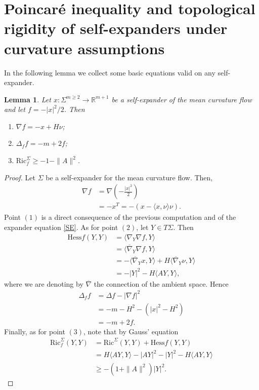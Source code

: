 \documentclass[11pt, leqno]{amsart}
\newtheorem{lemma}[theorem]{Lemma}
\begin{document}
\section{Poincar\'e inequality and topological rigidity of self-expanders under curvature assumptions}\label{SecPoincareExpanders}

In the following lemma we collect some basic equations valid on any self-expander.
\begin{lemma}\label{BasEqSE}
Let $x:\Sigma^{m\geq 2}\to\mathbb{R}^{m+1}$ be a self-expander of the mean curvature flow and let $f=-|x|^2/2$. Then
\begin{enumerate}
\item $\nabla f=-x+H\nu$;
\item $\Delta_f f=-m+2f$;
\item $\mathrm{Ric}^\Sigma_f\geq -1-\|A\|^2$.
\end{enumerate}
\end{lemma} 
\begin{proof}
Let $\Sigma$ be a self-expander for the mean curvature flow. Then, 
\begin{align*}
\nabla f&=\nabla\left(-\frac{|x|^2}{2}\right)\\
&=-x^T=-(x-\langle x,\nu\rangle \nu).
\end{align*}
Point $(1)$ is a direct consequence of the previous computation and of the expander equation \eqref{SE}. As for point $(2)$, let $Y\in T\Sigma$. Then
\begin{align*}
\mathrm{Hess} f(Y,Y)&=\langle \nabla_Y \nabla f,Y\rangle\\
&=\langle \overline{\nabla}_Y \nabla f,Y\rangle\\
&=-\langle \overline{\nabla}_Y x,Y\rangle+H\langle \overline{\nabla}_Y \nu,Y\rangle\\
&=-|Y|^2-H\langle AY,Y\rangle,
\end{align*}
where we are denoting by $\overline{\nabla}$ the connection of the ambient space. Hence
\begin{align*}
\Delta_f f&=\Delta f-|\nabla f|^2\\
&=-m-H^2-(|x|^2-H^2)\\
&=-m+2f.
\end{align*}
Finally, as for point $(3)$, note that by Gauss' equation
\begin{align*}
    \mathrm{Ric}_f^\Sigma(Y,Y)&=\mathrm{Ric}^\Sigma(Y,Y)+\mathrm{Hess} f(Y,Y)\\
    &=H\langle AY,Y\rangle-|AY|^2-|Y|^2-H\langle AY,Y\rangle\\
    &\geq -(1+\|A\|^2)|Y|^2.    
\end{align*}
\end{proof}
\end{document}
